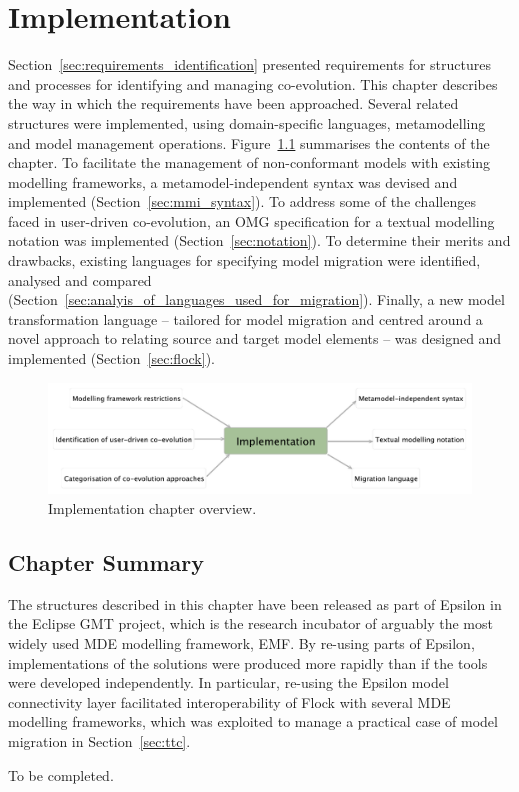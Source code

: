 
\chapter{Implementation}
\label{Implementation}
Section~\ref{sec:requirements_identification} presented requirements for structures and processes for identifying and managing co-evolution. This chapter describes the way in which the requirements have been approached. Several related structures were implemented, using domain-specific languages, metamodelling and model management operations. Figure~\ref{fig:implementation_overview} summarises the contents of the chapter. To facilitate the management of non-conformant models with existing modelling frameworks, a metamodel-independent syntax was devised and implemented (Section~\ref{sec:mmi_syntax}). To address some of the challenges faced in user-driven co-evolution, an OMG specification for a textual modelling notation was implemented (Section~\ref{sec:notation}). To determine their merits and drawbacks, existing languages for specifying model migration were identified, analysed and compared (Section~\ref{sec:analyis_of_languages_used_for_migration}). Finally, a new model transformation language -- tailored for model migration and centred around a novel approach to relating source and target model elements -- was designed and implemented (Section~\ref{sec:flock}). 

\begin{figure}[htbp]
  \begin{center}
    \leavevmode
    \includegraphics[width=12cm]{5.Implementation/overview.pdf}
  \end{center}
  \caption{Implementation chapter overview.}
  \label{fig:implementation_overview}
\end{figure}








\section{Chapter Summary}
The structures described in this chapter have been released as part of Epsilon in the Eclipse GMT \cite{gmt} project, which is the research incubator of arguably the most widely used MDE modelling framework, EMF. By re-using parts of Epsilon, implementations of the solutions were produced more rapidly than if the tools were developed independently. In particular, re-using the Epsilon model connectivity layer facilitated interoperability of Flock with several MDE modelling frameworks, which was exploited to manage a practical case of model migration in Section~\ref{sec:ttc}.   

To be completed.

